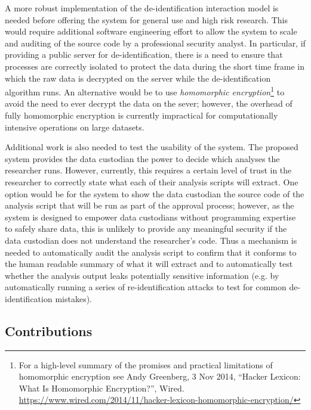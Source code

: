 A more robust implementation of the de-identification interaction model is needed before offering the system for general use and high risk research. This would require additional software engineering effort to allow the system to scale and auditing of the source code by a professional security analyst. In particular, if providing a public server for de-identification, there is a need to ensure that processes are correctly isolated to protect the data during the short time frame in which the raw data is decrypted on the server while the de-identification algorithm runs. An alternative would be to use \textit{homomorphic encryption}\footnote{For a high-level summary of the promises and practical limitations of homomorphic encryption see Andy Greenberg, 3 Nov 2014, ``Hacker Lexicon: What Is Homomorphic Encryption?'', Wired. \url{https://www.wired.com/2014/11/hacker-lexicon-homomorphic-encryption/}} to avoid the need to ever decrypt the data on the sever; however, the overhead of fully homomorphic encryption is currently impractical for computationally intensive operations on large datasets.

Additional work is also needed to test the usability of the system. The proposed system provides the data custodian the power to decide which analyses the researcher runs. However, currently, this requires a certain level of trust in the researcher to correctly state what each of their analysis scripts will extract. One option would be for the system to show the data custodian the source code of the analysis script that will be run as part of the approval process; however, as the system is designed to empower data custodians without programming expertise to safely share data, this is unlikely to provide any meaningful security if the data custodian does not understand the researcher's code. Thus a mechanism is needed to automatically audit the analysis script to confirm that it conforms to the human readable summary of what it will extract and to automatically test whether the analysis output leaks potentially sensitive information (e.g. by automatically running a series of re-identification attacks to test for common de-identification mistakes).


\subsection*{Contributions}

